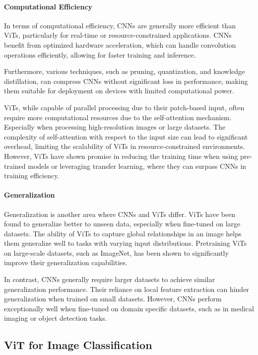 \paragraph{Computational Efficiency}

In terms of computational efficiency, CNNs are generally more efficient than ViTs, particularly for real-time or resource-constrained applications. CNNs benefit from optimized hardware acceleration, which can handle convolution operations efficiently, allowing for faster training and inference. 

Furthermore, various techniques, such as pruning, quantization, and knowledge distillation, can compress CNNs without significant loss in performance, making them suitable for deployment on devices with limited computational power.

ViTs, while capable of parallel processing due to their patch-based input, often require more computational resources due to the self-attention mechanism. Especially when processing high-resolution images or large datasets. The complexity of self-attention with respect to the input size can lead to significant overhead, limiting the scalability of ViTs in resource-constrained environments. However, ViTs have shown promise in reducing the training time when using pre-trained models or leveraging transfer learning, where they can surpass CNNs in training efficiency.

\paragraph{Generalization}

Generalization is another area where CNNs and ViTs differ. ViTs have been found to generalize better to unseen data, especially when fine-tuned on large datasets. The ability of ViTs to capture global relationships in an image helps them generalize well to tasks with varying input distributions. Pretraining ViTs on large-scale datasets, such as ImageNet, has been shown to significantly improve their generalization capabilities.

In contrast, CNNs generally require larger datasets to achieve similar generalization performance. Their reliance on local feature extraction can hinder generalization when trained on small datasets. However, CNNs perform exceptionally well when fine-tuned on domain specific datasets, such as in medical imaging or object detection tasks.

\subsection*{ViT for Image Classification}


